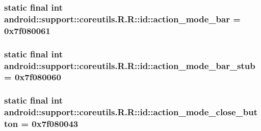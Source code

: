 \hypertarget{classandroid_1_1support_1_1coreutils_1_1_r_1_1id_d455f1c72aa4d94d1467a65e746631d3}{
\subsubsection[{action\_\-mode\_\-bar}]{\setlength{\rightskip}{0pt plus 5cm}static final int android::support::coreutils.R.R::id::action\_\-mode\_\-bar = 0x7f080061}}
\label{classandroid_1_1support_1_1coreutils_1_1_r_1_1id_d455f1c72aa4d94d1467a65e746631d3}


\hypertarget{classandroid_1_1support_1_1coreutils_1_1_r_1_1id_1afdddea84d42c9f16243be14192d5d1}{
\subsubsection[{action\_\-mode\_\-bar\_\-stub}]{\setlength{\rightskip}{0pt plus 5cm}static final int android::support::coreutils.R.R::id::action\_\-mode\_\-bar\_\-stub = 0x7f080060}}
\label{classandroid_1_1support_1_1coreutils_1_1_r_1_1id_1afdddea84d42c9f16243be14192d5d1}


\hypertarget{classandroid_1_1support_1_1coreutils_1_1_r_1_1id_d6f53dcc5e53b180c7a22dd1646cb891}{
\subsubsection[{action\_\-mode\_\-close\_\-button}]{\setlength{\rightskip}{0pt plus 5cm}static final int android::support::coreutils.R.R::id::action\_\-mode\_\-close\_\-button = 0x7f080043}}
\label{classandroid_1_1support_1_1coreutils_1_1_r_1_1id_d6f53dcc5e53b180c7a22dd1646cb891}


